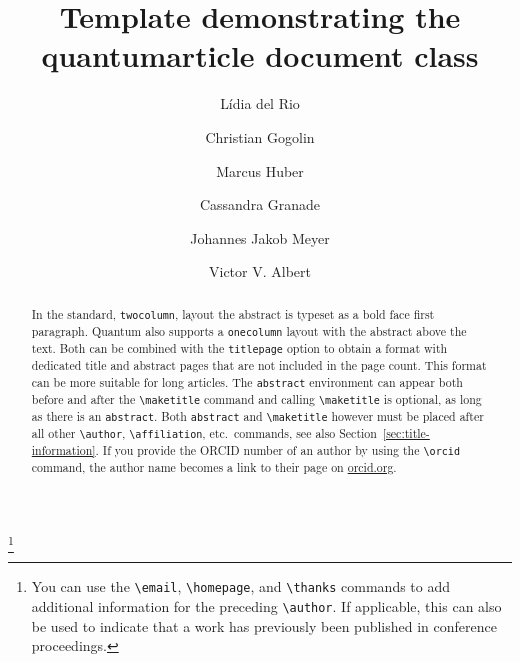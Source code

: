 \documentclass[a4paper,twocolumn,11pt,accepted=2017-05-09]{quantumarticle}
\begin{document}
\title{Template demonstrating the quantumarticle document class}

\author{Lídia del Rio}
\author{Christian Gogolin}
\thanks{You can use the \texttt{\textbackslash{}email}, \texttt{\textbackslash{}homepage}, and \texttt{\textbackslash{}thanks} commands to add additional information for the preceding \texttt{\textbackslash{}author}. If applicable, this can also be used to indicate that a work has previously been published in conference proceedings.}
\author{Marcus Huber}
\author{Cassandra Granade}
\author{Johannes Jakob Meyer}
\author{Victor V. Albert}
\maketitle

\begin{abstract}
  In the standard, \texttt{twocolumn}, layout the abstract is typeset as a bold face first paragraph.
  Quantum also supports a \texttt{onecolumn} layout with the abstract above the text.
  Both can be combined with the \texttt{titlepage} option to obtain a format with dedicated title and abstract pages that are not included in the page count.
  This format can be more suitable for long articles.
  The \texttt{abstract} environment can appear both before and after the \texttt{\textbackslash{}maketitle} command and calling \texttt{\textbackslash{}maketitle} is optional, as long as there is an \texttt{abstract}.
  Both \texttt{abstract} and \texttt{\textbackslash{}maketitle} however must be placed after all other \texttt{\textbackslash{}author}, \texttt{\textbackslash{}affiliation}, etc.\ commands, see also Section~\ref{sec:title-information}.
  If you provide the ORCID number of an author by using the \texttt{\textbackslash{}orcid} command, the author name becomes a link to their page on \href{http://orcid.org/}{orcid.org}.
\end{abstract}
\end{document}
